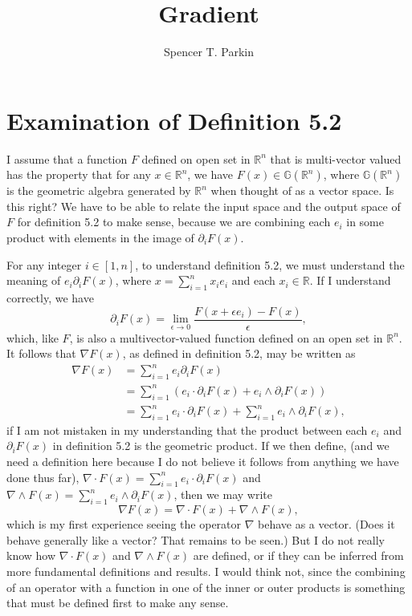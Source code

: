 \documentclass[12pt]{article}
\title{Gradient}
\author{Spencer T. Parkin}
\newcommand{\G}{\mathbb{G}}
\newcommand{\R}{\mathbb{R}}
\begin{document}
\section*{Examination of Definition 5.2}

I assume that a function $F$ defined on open set in $\R^n$ that is multi-vector valued has
the property that for any $x\in\R^n$, we have $F(x)\in\G(\R^n)$, where $\G(\R^n)$
is the geometric algebra generated by $\R^n$ when thought of as a vector space.
Is this right?  We have to be able to relate the input space and the output space of $F$ for
definition 5.2 to make sense, because we are combining each $e_i$ in some product with
elements in the image of $\partial_i F(x)$.

For any integer $i\in[1,n]$, to understand definition 5.2, we must understand
the meaning of $e_i\partial_i F(x)$, where $x= \sum_{i=1}^n x_i e_i$ and each $x_i\in\R$.  If I understand correctly,
we have
\begin{equation*}
\partial_i F(x) = \lim_{\epsilon\to 0}\frac{F(x + \epsilon e_i)-F(x)}{\epsilon},
\end{equation*}
which, like $F$, is also a multivector-valued function defined on an open set in $\R^n$.
It follows that $\nabla F(x)$, as defined in definition 5.2, may be written as
\begin{align*}
\nabla F(x) &= \sum_{i=1}^n e_i\partial_i F(x) \\
 &= \sum_{i=1}^n\left( e_i\cdot\partial_i F(x) + e_i\wedge\partial_i F(x)\right) \\
 &= \sum_{i=1}^n e_i\cdot\partial_i F(x) + \sum_{i=1}^n e_i\wedge\partial_i F(x),
\end{align*}
if I am not mistaken in my understanding that the product between each $e_i$ and
$\partial_i F(x)$ in definition 5.2 is the geometric product.  If we then define,
(and we need a definition here because I do not believe it follows from anything
we have done thus far), $\nabla\cdot F(x)=\sum_{i=1}^n e_i\cdot\partial_i F(x)$
and $\nabla\wedge F(x)=\sum_{i=1}^n e_i\wedge\partial_i F(x)$, then we may write
\begin{equation*}
\nabla F(x) = \nabla\cdot F(x) + \nabla\wedge F(x),
\end{equation*}
which is my first experience seeing the operator $\nabla$ behave as a vector.
(Does it behave generally like a vector?  That remains to be seen.)  But I do
not really know how $\nabla\cdot F(x)$ and $\nabla\wedge F(x)$ are defined,
or if they can be inferred from more fundamental definitions and results.
I would think not, since the combining of an operator with a function in one of
the inner or outer products is something that must be defined first to make any sense.
\end{document}
